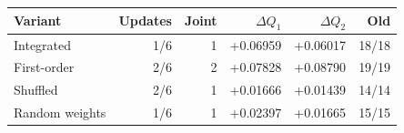 \begin{tabular}{lrrrrr}
\toprule
Variant & Updates & Joint & $\Delta Q_1$ & $\Delta Q_2$ & Old \\
\midrule
Integrated & 1/6 & 1 & +0.06959 & +0.06017 & 18/18 \\
First-order & 2/6 & 2 & +0.07828 & +0.08790 & 19/19 \\
Shuffled & 2/6 & 1 & +0.01666 & +0.01439 & 14/14 \\
Random weights & 1/6 & 1 & +0.02397 & +0.01665 & 15/15 \\
\bottomrule
\end{tabular}
